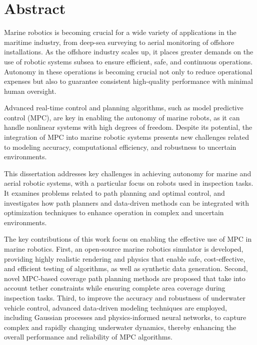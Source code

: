 \chapter*{Abstract}

Marine robotics is becoming crucial for a wide variety of applications in the maritime industry, from deep-sea surveying to aerial monitoring of offshore installations. As the offshore industry scales up, it places greater demands on the use of robotic systems subsea to ensure efficient, safe, and continuous operations. Autonomy in these operations is becoming crucial not only to reduce operational expenses but also to guarantee consistent high-quality performance with minimal human oversight.

Advanced real-time control and planning algorithms, such as model predictive control (MPC), are key in enabling the autonomy of marine robots, as it can handle nonlinear systems with high degrees of freedom.  Despite its potential, the integration of MPC into marine robotic systems presents new challenges related to modeling accuracy, computational efficiency, and robustness to uncertain environments.


This dissertation addresses key challenges in achieving autonomy for marine and aerial robotic systems, with a particular focus on robots used in inspection tasks. It examines problems related to path planning and optimal control, and investigates how path planners and data-driven methods can be integrated with optimization techniques to enhance operation in complex and uncertain environments.


The key contributions of this work focus on enabling the effective use of MPC in marine robotics. First, an open-source marine robotics simulator is developed, providing highly realistic rendering and physics that enable safe, cost-effective, and efficient testing of algorithms, as well as synthetic data generation. Second, novel MPC-based coverage path planning methods are proposed that take into account tether constraints while ensuring complete area coverage during inspection tasks. Third, to improve the accuracy and robustness of underwater vehicle control, advanced data-driven modeling techniques are employed, including Gaussian processes and physics-informed neural networks, to capture complex and rapidly changing underwater dynamics, thereby enhancing the overall performance and reliability of MPC algorithms.

